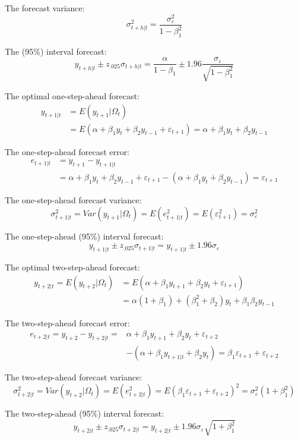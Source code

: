 \documentclass[
  oneside]{book}
\begin{document}
The forecast variance: \[\sigma_{t+h|t}^2 = \frac{\sigma_{\varepsilon}^2}{1-\beta_1^2}\]

The (95\%) interval forecast: \[y_{t+h|t} \pm z_{.025}\sigma_{t+h|t} = \frac{\alpha}{1-\beta_1} \pm 1.96\frac{\sigma_{\varepsilon}}{\sqrt{1-\beta_1^2}}\]

The optimal one-step-ahead forecast:
\[\begin{aligned}
y_{t+1|t} &= E(y_{t+1}|\Omega_t) \\
&= E(\alpha + \beta_1 y_{t} + \beta_2 y_{t-1} + \varepsilon_{t+1}) = \alpha + \beta_1 y_{t} + \beta_2 y_{t-1}
\end{aligned}\]

The one-step-ahead forecast error:
\[\begin{aligned}
e_{t+1|t} &= y_{t+1} - y_{t+1|t} \\
&= \alpha + \beta_1 y_t + \beta_2 y_{t-1} + \varepsilon_{t+1} - (\alpha + \beta_1 y_t + \beta_2 y_{t-1}) = \varepsilon_{t+1}
\end{aligned}\]

The one-step-ahead forecast variance: \[\sigma_{t+1|t}^2 = Var(y_{t+1}|\Omega_t) = E(e_{t+1|t}^2) = E(\varepsilon_{t+1}^2) = \sigma_{\varepsilon}^2\]

The one-step-ahead (95\%) interval forecast: \[y_{t+1|t} \pm z_{.025}\sigma_{t+1|t} = y_{t+1|t} \pm 1.96\sigma_{\varepsilon}\]

The optimal two-step-ahead forecast:
\[\begin{aligned}
y_{t+2|t} = E(y_{t+2}|\Omega_t) &= E(\alpha + \beta_1 y_{t+1} + \beta_2 y_{t} + \varepsilon_{t+1}) \\
&= \alpha(1+\beta_1) + (\beta_1^2+\beta_2) y_{t} + \beta_1\beta_2 y_{t-1}
\end{aligned}\]

The two-step-ahead forecast error:
\[\begin{aligned}
e_{t+2|t} = y_{t+2} - y_{t+2|t} =& \alpha + \beta_1 y_{t+1} + \beta_2 y_{t} + \varepsilon_{t+2} \\
&- (\alpha + \beta_1 y_{t+1|t} + \beta_2 y_{t}) = \beta_1\varepsilon_{t+1} + \varepsilon_{t+2}
\end{aligned}\]

The two-step-ahead forecast variance:
\[\sigma_{t+2|t}^2 = Var(y_{t+2}|\Omega_t) = E(e_{t+2|t}^2) = E(\beta_1\varepsilon_{t+1} + \varepsilon_{t+2})^2 = \sigma_{\varepsilon}^2(1+\beta_1^2)\]

The two-step-ahead (95\%) interval forecast: \[y_{t+2|t} \pm z_{.025}\sigma_{t+2|t} = y_{t+2|t} \pm 1.96\sigma_{\varepsilon}\sqrt{1+\beta_1^2}\]
\end{document}
